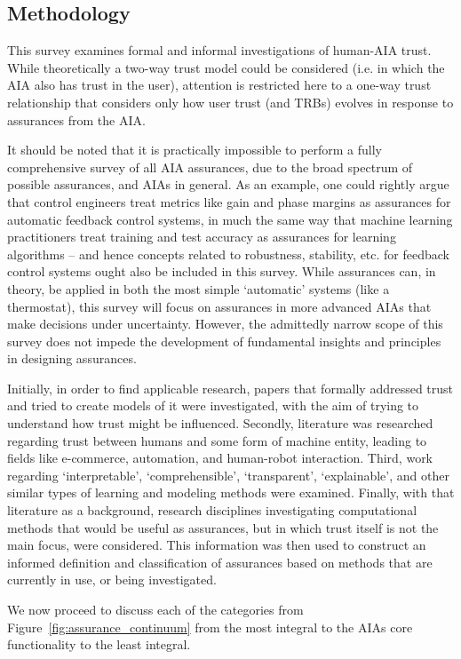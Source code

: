 \subsection{Methodology} \label{sec:methodology}
    This survey examines formal and informal investigations of human-AIA trust. While theoretically a two-way trust model could be considered (i.e. in which the AIA also has trust in the user), attention is restricted here to a one-way trust relationship that considers only how user trust (and TRBs) evolves in response to assurances from the AIA. 

    It should be noted that it is practically impossible to perform a fully comprehensive survey of all AIA assurances, due to the broad spectrum of possible assurances, and AIAs in general. As an example, one could rightly argue that control engineers treat metrics like gain and phase margins as assurances for automatic feedback control systems, in much the same way that machine learning practitioners treat training and test accuracy as assurances for learning algorithms -- and hence concepts related to robustness, stability, etc. for feedback control systems ought also be included in this survey. While assurances can, in theory, be applied in both the most simple `automatic' systems (like a thermostat), this survey will focus on assurances in more advanced AIAs that make decisions under uncertainty. However, the admittedly narrow scope of this survey does not impede the development of fundamental insights and principles in designing assurances.

    Initially, in order to find applicable research, papers that formally addressed trust and tried to create models of it were investigated, with the aim of trying to understand how trust might be influenced. Secondly, literature was researched regarding trust between humans and some form of machine entity, leading to fields like e-commerce, automation, and human-robot interaction. Third, work regarding `interpretable', `comprehensible', `transparent', `explainable', and other similar types of learning and modeling methods were examined. Finally, with that literature as a background, research disciplines investigating computational methods that would be useful as assurances, but in which trust itself is not the main focus, were considered. This information was then used to construct an informed definition and classification of assurances based on methods that are currently in use, or being investigated.
    
    We now proceed to discuss each of the categories from Figure~\ref{fig:assurance_continuum} from the most integral to the AIAs core functionality to the least integral.

